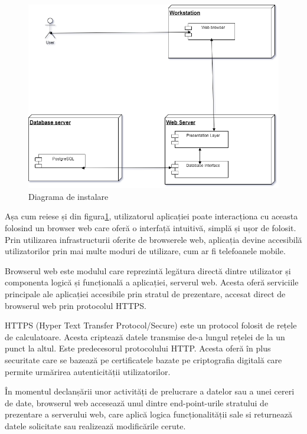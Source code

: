 \documentclass[12pt,a4paper]{report}
\theoremstyle{definition}
\theoremstyle{remark}
\begin{document}
\begin{figure}[H]
    \centering
    \includegraphics[width=0.75\linewidth]{resurse/diagrame/Diagrama_Arhitectura2.drawio.png}
    \caption{Diagrama de instalare}\label{fig:arhitect}
\end{figure}

\par Așa cum reiese și din figura\ref{fig:arhitect}, utilizatorul aplicației poate interacționa cu aceasta folosind un browser web care oferă o interfață intuitivă, simplă și ușor de folosit. Prin utilizarea infrastructurii oferite de browserele web, aplicația devine accesibilă utilizatorilor prin mai multe moduri de utilizare, cum ar fi telefoanele mobile.

\par Browserul web este modulul care reprezintă legătura directă dintre utilizator și componenta logică și funcțională a aplicației, serverul web. Acesta oferă serviciile principale ale aplicației accesibile prin stratul de prezentare, accesat direct de browserul web prin protocolul HTTPS\@.

\par HTTPS (Hyper Text Transfer Protocol/Secure) este un protocol folosit de rețele de calculatoare. Acesta criptează datele transmise de-a lungul rețelei de la un punct la altul. Este predecesorul protocolului HTTP\@. Acesta oferă în plus securitate care se bazează pe certificatele bazate pe criptografia digitală care permite urmărirea autenticității utilizatorilor.

\par În momentul declanșării unor activități de prelucrare a datelor sau a unei cereri de date, browserul web accesează unul dintre end-point-urile stratului de prezentare a serverului web, care aplică logica funcționalității sale si returnează datele solicitate sau realizează modificările cerute.
\end{document}
